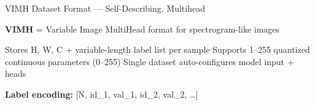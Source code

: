 

\begin{slide}[\slideopts,toc={VIMH Format}]{VIMH Dataset Format --- Self-Describing, Multihead}
  \vspace{-0.75em}
  \begin{itemize}
    \mpitem \textbf{VIMH} = Variable Image MultiHead format for spectrogram-like images
    \vspace{-0.25em}
    \begin{itemize}
      \mpitem Stores H, W, C + variable-length label list per sample
      \mpitem Supports 1--255 quantized continuous parameters (0--255)
      \mpitem Single dataset auto-configures model input + heads
    \end{itemize}
    \vspace{0.25em}
    \mpitem \textbf{Label encoding:} [N, id\_1, val\_1, id\_2, val\_2, \dots]
  \end{itemize}
  \vspace{-0.5em}
  \begin{center}

\end{center}
\end{slide}
